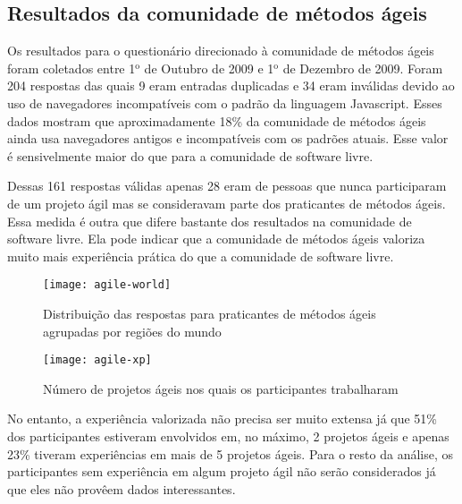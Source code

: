 \subsection{Resultados da comunidade de métodos ágeis}
\label{sec:resp-agile}

Os resultados para o questionário direcionado à comunidade de métodos
ágeis foram coletados entre 1$^{\textrm{o}}$ de Outubro de 2009 e
1$^{\textrm{o}}$ de Dezembro de 2009. Foram 204 respostas das quais 9
eram entradas duplicadas e 34 eram inválidas devido ao uso de
navegadores incompatíveis com o padrão da linguagem Javascript. Esses
dados mostram que aproximadamente 18\% da comunidade de métodos ágeis
ainda usa navegadores antigos e incompatíveis com os padrões
atuais. Esse valor é sensivelmente maior do que para a comunidade de
software livre.

Dessas 161 respostas válidas apenas 28 eram de pessoas que nunca
participaram de um projeto ágil mas se consideravam parte dos
praticantes de métodos ágeis. Essa medida é outra que difere bastante
dos resultados na comunidade de software livre. Ela pode indicar que a
comunidade de métodos ágeis valoriza muito mais experiência prática do
que a comunidade de software livre.


\begin{figure}[htb]
  \begin{minipage}[t]{0.45\linewidth}
    \centering
    \texttt{[image: agile-world]}
    \caption{Distribuição das respostas para praticantes de métodos
      ágeis agrupadas por regiões do mundo}
    \label{fig:agile-world}
  \end{minipage}
  \begin{minipage}[t]{0.55\linewidth}
    \centering
    \texttt{[image: agile-xp]}
    \caption{Número de projetos ágeis nos quais os participantes
      trabalharam}
    \label{fig:agile-xp}
  \end{minipage}
\end{figure}

No entanto, a experiência valorizada não precisa ser muito extensa já
que 51\% dos participantes estiveram envolvidos em, no máximo, 2
projetos ágeis e apenas 23\% tiveram experiências em mais de 5
projetos ágeis.  Para o resto da análise, os participantes sem
experiência em algum projeto ágil não serão considerados já que eles
não provêem dados interessantes.


